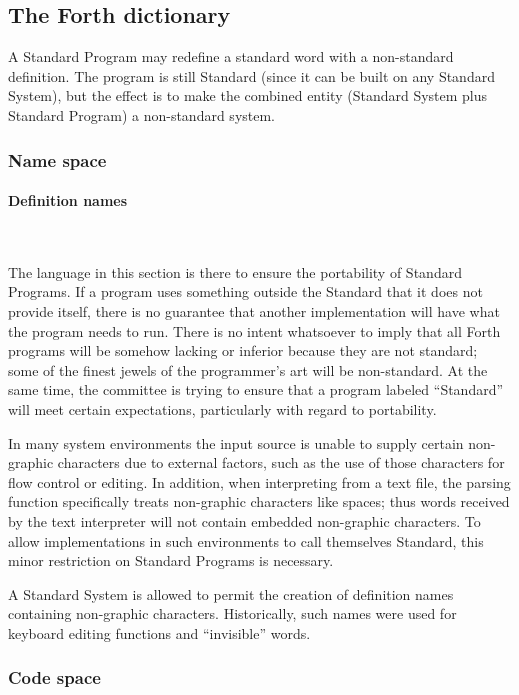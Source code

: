 \subsection{The Forth dictionary} %

A Standard Program may redefine a standard word with a non-standard
definition. The program is still Standard (since it can be built on
any Standard System), but the effect is to make the combined entity
(Standard System plus Standard Program) a non-standard system.

\subsubsection{Name space} %

\setcounter{paragraph}{1}
\paragraph{Definition names} ~ %

The language in this section is there to ensure the portability of
Standard Programs. If a program uses something outside the Standard
that it does not provide itself, there is no guarantee that another
implementation will have what the program needs to run. There is no
intent whatsoever to imply that all Forth programs will be somehow
lacking or inferior because they are not standard; some of the finest
jewels of the programmer's art will be non-standard. At the same time,
the committee is trying to ensure that a program labeled ``Standard''
will meet certain expectations, particularly with regard to portability.

In many system environments the input source is unable to supply
certain non-graphic characters due to external factors, such as the
use of those characters for flow control or editing. In addition,
when interpreting from a text file, the parsing function specifically
treats non-graphic characters like spaces; thus words received by the
text interpreter will not contain embedded non-graphic characters. To
allow implementations in such environments to call themselves Standard,
this minor restriction on Standard Programs is necessary.

A Standard System is allowed to permit the creation of definition
names containing non-graphic characters. Historically, such names
were used for keyboard editing functions and ``invisible'' words.

\subsubsection{Code space} %

